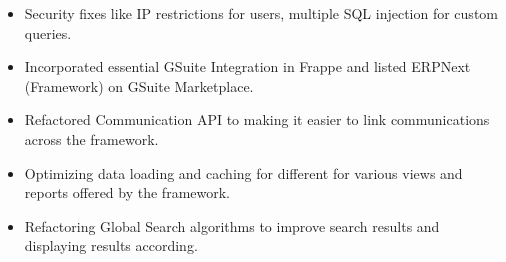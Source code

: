 \begin{cventries}
{\begin{cvitems}
            \begin{itemize}
                \item {Security fixes like IP restrictions for users, multiple SQL injection for custom queries.}
                \item {Incorporated essential GSuite Integration in Frappe and listed ERPNext (Framework) on GSuite Marketplace.}
                \item {Refactored Communication API to making it easier to link communications across the framework.}
                \item {Optimizing data loading and caching for different for various views and reports offered by the framework.}
                \item {Refactoring Global Search algorithms to improve search results and displaying results according.}
            \end{itemize}
      \end{cvitems}
    }
\end{cventries}